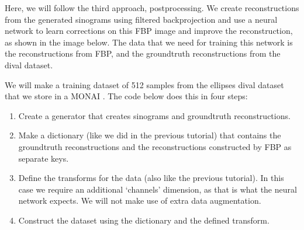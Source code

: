 \documentclass[letterpaper,10pt,english]{jupyterBook}
\begin{document}
\sphinxAtStartPar
Here, we will follow the third approach, postprocessing. We create reconstructions from the generated sinograms using filtered backprojection and use a neural network to learn corrections on this FBP image and improve the reconstruction, as shown in the image below. The data that we need for training this network is the reconstructions from FBP, and the ground\sphinxhyphen{}truth reconstructions from the dival dataset.


\sphinxAtStartPar
We will make a training dataset of 512 samples from the ellipses dival dataset that we store in a MONAI . The code below does this in four steps:
\begin{enumerate}
%
\item {} 
\sphinxAtStartPar
Create a  generator that creates sinograms and ground\sphinxhyphen{}truth reconstructions.

\item {} 
\sphinxAtStartPar
Make a dictionary (like we did in the previous tutorial) that contains the ground\sphinxhyphen{}truth reconstructions and the reconstructions constructed by FBP as separate keys.

\item {} 
\sphinxAtStartPar
Define the transforms for the data (also like the previous tutorial). In this case we require an additional ‘channels’ dimension, as that is what the neural network expects. We will not make use of extra data augmentation.

\item {} 
\sphinxAtStartPar
Construct the dataset using the dictionary and the defined transform.

\end{enumerate}
\end{document}
